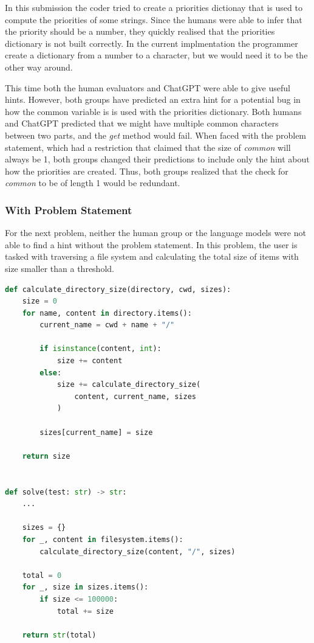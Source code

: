 \documentclass[12pt,a4paper]{report}
\begin{document}
In this submission the coder tried to create a priorities dictionay that is used to compute the priorities of some strings. Since the humans were able to infer that the priority should be a number, they quickly realised that the priorities dictionary is not built correctly. In the current implmentation the programmer create a dictionary from a number to a character, but we would need it to be the other way around.

This time both the human evaluators and ChatGPT were able to give useful hints. However, both groups have predicted an extra hint for a potential bug in how the common variable is is used with the priorities dictionary. Both humans and ChatGPT predicted that we might have multiple common characters between two parts, and the \textit{get} method would fail. When faced with the problem statement, which had a restriction that claimed that the size of \textit{common} will always be 1, both groups changed their predictions to include only the hint about how the priorities are created. Thus, both groups realized that the check for \textit{common} to be of length 1 would be redundant.

\subsubsection{With Problem Statement}

For the next problem, neither the human group or the language models were not able to find a hint without the problem statement. In this problem, the user is tasked with traversing a file system and calculating the total size of items with size smaller than a threshold.

\begin{lstlisting}[language=Python]
def calculate_directory_size(directory, cwd, sizes):
    size = 0
    for name, content in directory.items():
        current_name = cwd + name + "/"

        if isinstance(content, int):
            size += content
        else:
            size += calculate_directory_size(
                content, current_name, sizes
            )

        sizes[current_name] = size

    return size


def solve(test: str) -> str:
    ...

    sizes = {}
    for _, content in filesystem.items():
        calculate_directory_size(content, "/", sizes)

    total = 0
    for _, size in sizes.items():
        if size <= 100000:
            total += size

    return str(total)
\end{lstlisting}
\end{document}
